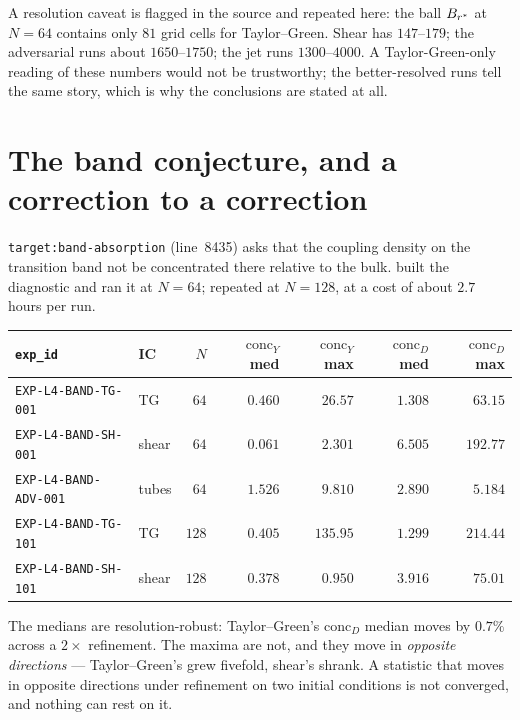 A resolution caveat is flagged in the source and repeated here: the ball
\(B_{r^{*}}\) at \(N=64\) contains only \(81\) grid cells for Taylor--Green.
Shear has \(147\)--\(179\); the adversarial runs about \(1650\)--\(1750\); the
jet runs \(1300\)--\(4000\). A Taylor-Green-only reading of these numbers would
not be trustworthy; the better-resolved runs tell the same story, which is why
the conclusions are stated at all.

\section{The band conjecture, and a correction to a correction}
\label{sec:band}

\texttt{target:band-absorption} (line~8435) asks that the coupling density on
the transition band not be concentrated there relative to the bulk. 
built the diagnostic and ran it at \(N=64\);  repeated at \(N=128\), at
a cost of about \(2.7\) hours per run.

\begin{center}
\small
\begin{tabular}{@{}l l r r r r r@{}}
\toprule
\texttt{exp\_id} & IC & \(N\) & \(\mathrm{conc}_Y\) med & \(\mathrm{conc}_Y\) max &
\(\mathrm{conc}_D\) med & \(\mathrm{conc}_D\) max \\
\midrule
\texttt{EXP-L4-BAND-TG-001} & TG & \(64\) & \(0.460\) & \(26.57\) & \(1.308\) & \(63.15\) \\
\texttt{EXP-L4-BAND-SH-001} & shear & \(64\) & \(0.061\) & \(2.301\) & \(6.505\) & \(192.77\) \\
\texttt{EXP-L4-BAND-ADV-001} & tubes & \(64\) & \(1.526\) & \(9.810\) & \(2.890\) & \(5.184\) \\
\texttt{EXP-L4-BAND-TG-101} & TG & \(128\) & \(0.405\) & \(135.95\) & \(1.299\) & \(214.44\) \\
\texttt{EXP-L4-BAND-SH-101} & shear & \(128\) & \(0.378\) & \(0.950\) & \(3.916\) & \(75.01\) \\
\bottomrule
\end{tabular}
\end{center}

\medskip
The medians are resolution-robust: Taylor--Green's \(\mathrm{conc}_D\) median
moves by \(0.7\%\) across a \(2\times\) refinement. The maxima are not, and
they move in \emph{opposite directions} --- Taylor--Green's grew fivefold,
shear's shrank. A statistic that moves in opposite directions under refinement
on two initial conditions is not converged, and nothing can rest on it.

